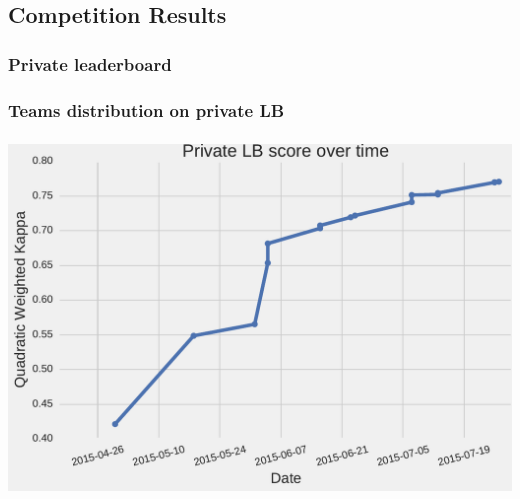 \subsection{Competition Results}

\begin{frame}\frametitle{Private leaderboard} 
\vspace{-20pt}
\begin{center}
\begin{figure}
\end{figure}
\end{center}
\end{frame}


\begin{frame}\frametitle{Teams distribution on private LB} 
\vspace{-20pt}
\begin{center}
\end{center}
\end{frame}


\begin{frame}\frametitle{} 
\begin{center}
\includegraphics[width=\textwidth]{pics/private_lb_score_increase.pdf}
\end{center}
\end{frame}

